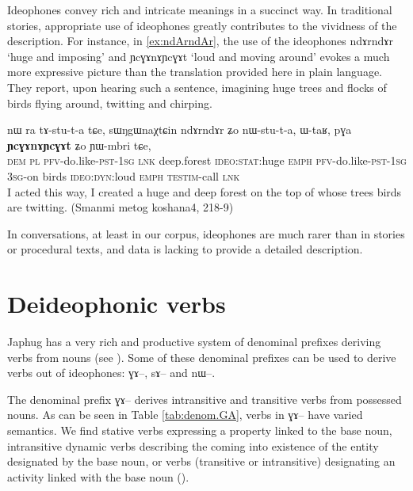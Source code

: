 \documentclass[oldfontcommands,oneside,a4paper,11pt]{article}
\newcommand{\ipa}[1]{{\phon \mbox{#1}}} %
\begin{document}
  
Ideophones convey  rich and intricate meanings in a succinct way. In traditional stories, appropriate use of ideophones greatly contributes to the vividness of the description. For instance, in  \ref{ex:ndArndAr}, the use of the ideophones \ipa{ndɤrndɤr}     `huge and imposing'	and 	\ipa{ɲcɣɤnɤɲcɣɤt} `loud and moving around' evokes  a much more expressive picture than the  translation provided here in plain language. They report, upon hearing such a sentence, imagining huge trees and flocks of birds flying around, twitting and chirping.

\begin{exe}
\ex \label{ex:ndArndAr}
 \gll 
\ipa{nɯ}  	\ipa{ra}  	\ipa{tɤ-stu-t-a}  	\ipa{tɕe,}  	\ipa{sɯŋgɯnaχtɕin}  	\ipa{ndɤrndɤr}  	\ipa{ʑo}  	\ipa{nɯ-stu-t-a,}  	\ipa{ɯ-taʁ,}  	\ipa{pɣa}  	\ipa{\textbf{ɲcɣɤnɤɲcɣɤt}}  	\ipa{ʑo}  	\ipa{ɲɯ-mbri}  	\ipa{tɕe,}  \\
\textsc{dem} \textsc{pl} \textsc{pfv}-do.like-\textsc{pst-1sg} \textsc{lnk} deep.forest \textsc{ideo:stat}:huge \textsc{emph} \textsc{pfv}-do.like-\textsc{pst-1sg} \textsc{3sg}-on birds \textsc{ideo:dyn}:loud \textsc{emph} \textsc{testim}-call \textsc{lnk} \\
\glt I acted this way, I created a huge and deep forest on the top of whose trees birds are twitting. (Smanmi metog koshana4, 218-9)
\end{exe}



In conversations, at least in our corpus, ideophones are much rarer than in stories or procedural texts, and data is lacking to provide a detailed description. 

  
 \section{Deideophonic verbs} \label{sec:deideophonic}
 Japhug has a very rich and productive   system of denominal prefixes deriving verbs from nouns (see \citealt{jacques12incorp, jacques14antipassive}). Some of these denominal prefixes can be used to derive verbs out of ideophones: \ipa{ɣɤ--}, \ipa{sɤ--} and \ipa{nɯ--}.
 
 The denominal prefix \ipa{ɣɤ--} derives intransitive and transitive verbs from possessed nouns. As can be seen in Table \ref{tab:denom.GA},  verbs in \ipa{ɣɤ--} have  varied semantics. We find stative verbs expressing a property linked to the base noun, intransitive dynamic verbs describing the coming into existence of the entity designated by the base noun, or  verbs  (transitive or intransitive) designating an activity linked with the base noun (\citealt[1218]{jacques12incorp}).
 
\end{document}

